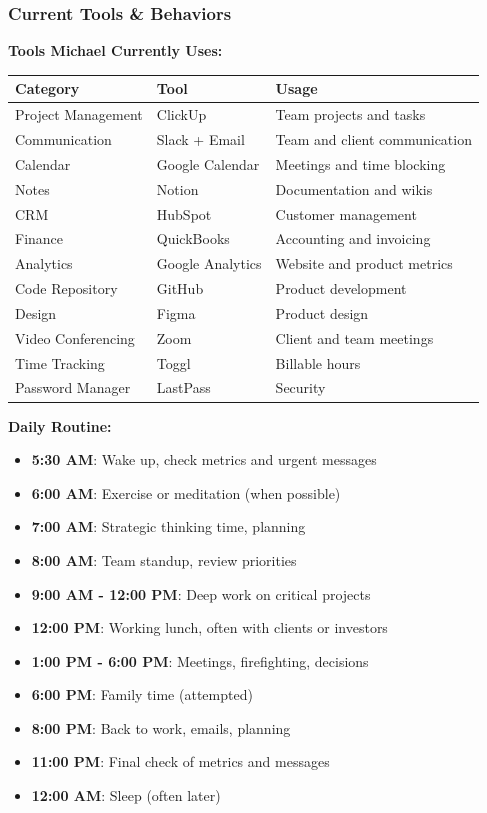 \subsubsection{Current Tools \& Behaviors}

\textbf{Tools Michael Currently Uses:}

\begin{table}[H]
\centering
\begin{tabular}{|l|l|p{6cm}|}
\hline
\rowcolor{lightgray}
\textbf{Category} & \textbf{Tool} & \textbf{Usage} \\
\hline
Project Management & ClickUp & Team projects and tasks \\
\hline
Communication & Slack + Email & Team and client communication \\
\hline
Calendar & Google Calendar & Meetings and time blocking \\
\hline
Notes & Notion & Documentation and wikis \\
\hline
CRM & HubSpot & Customer management \\
\hline
Finance & QuickBooks & Accounting and invoicing \\
\hline
Analytics & Google Analytics & Website and product metrics \\
\hline
Code Repository & GitHub & Product development \\
\hline
Design & Figma & Product design \\
\hline
Video Conferencing & Zoom & Client and team meetings \\
\hline
Time Tracking & Toggl & Billable hours \\
\hline
Password Manager & LastPass & Security \\
\hline
\end{tabular}
\end{table}

\textbf{Daily Routine:}

\begin{itemize}
    \item \textbf{5:30 AM}: Wake up, check metrics and urgent messages
    \item \textbf{6:00 AM}: Exercise or meditation (when possible)
    \item \textbf{7:00 AM}: Strategic thinking time, planning
    \item \textbf{8:00 AM}: Team standup, review priorities
    \item \textbf{9:00 AM - 12:00 PM}: Deep work on critical projects
    \item \textbf{12:00 PM}: Working lunch, often with clients or investors
    \item \textbf{1:00 PM - 6:00 PM}: Meetings, firefighting, decisions
    \item \textbf{6:00 PM}: Family time (attempted)
    \item \textbf{8:00 PM}: Back to work, emails, planning
    \item \textbf{11:00 PM}: Final check of metrics and messages
    \item \textbf{12:00 AM}: Sleep (often later)
\end{itemize}

